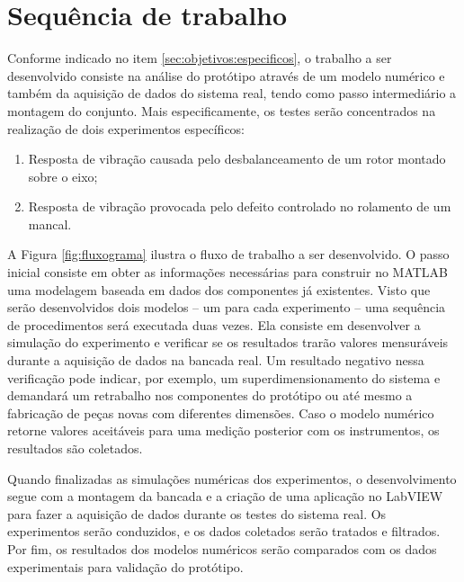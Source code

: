 \documentclass[12pt,openright,oneside,a4paper,
	chapter=TITLE,section=TITLE,
	english,brazil]{abntex2}
\begin{document}
	\begin{figure}[h]
		\label{fig:componentes}
	\end{figure}

	\section{Sequência de trabalho}
	Conforme indicado no item \ref{sec:objetivos:especificos}, o trabalho a ser desenvolvido consiste na análise do protótipo através de um modelo numérico e também da aquisição de dados do sistema real, tendo como passo intermediário a montagem do conjunto. Mais especificamente, os testes serão concentrados na realização de dois experimentos específicos:
	\begin{enumerate}
		\setlength{\itemsep}{0pt plus 2pt minus 1pt}
		\item Resposta de vibração causada pelo desbalanceamento de um rotor montado sobre o eixo;
		\item Resposta de vibração provocada pelo defeito controlado no rolamento de um mancal.
	\end{enumerate}
	
	A Figura \ref{fig:fluxograma} ilustra o fluxo de trabalho a ser desenvolvido. O passo inicial consiste em obter as informações necessárias para construir no MATLAB\textsuperscript{\textregistered} uma modelagem baseada em dados dos componentes já existentes. Visto que serão desenvolvidos dois modelos -- um para cada experimento -- uma sequência de procedimentos será executada duas vezes. Ela consiste em desenvolver a simulação do experimento e verificar se os resultados trarão valores mensuráveis durante a aquisição de dados na bancada real. Um resultado negativo nessa verificação pode indicar, por exemplo, um superdimensionamento do sistema e demandará um retrabalho nos componentes do protótipo ou até mesmo a fabricação de peças novas com diferentes dimensões. Caso o modelo numérico retorne valores aceitáveis para uma medição posterior com os instrumentos, os resultados são coletados. 
	
	Quando finalizadas as simulações numéricas dos experimentos, o desenvolvimento segue com a montagem da bancada e a criação de uma aplicação no LabVIEW\textsuperscript{\textregistered} para fazer a aquisição de dados durante os testes do sistema real. Os experimentos serão conduzidos, e os dados coletados serão tratados e filtrados. Por fim, os resultados dos modelos numéricos serão comparados com os dados experimentais para validação do protótipo.
\end{document}
